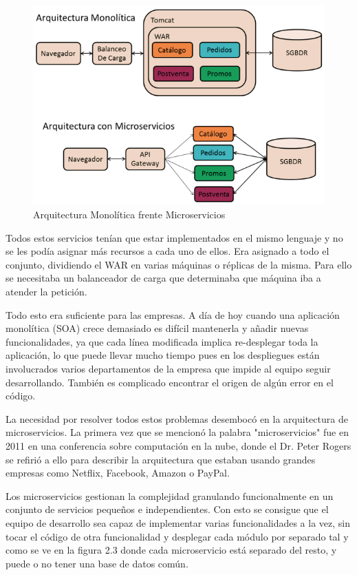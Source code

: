 \documentclass[12pt]{report} %
\begin{document}
\begin{figure}
	\centering
	\includegraphics[width=0.7\linewidth]{imagenes/soavsmicroservicios}
	\caption{Arquitectura Monolítica frente Microservicios}
	\label{fig:soavsmicroservicios}
\end{figure}

Todos estos servicios tenían que estar implementados en el mismo lenguaje y no se les podía asignar más recursos a cada uno de ellos. Era asignado a todo el conjunto, dividiendo el WAR en varias máquinas o réplicas de la misma. Para ello se necesitaba un balanceador de carga que determinaba que máquina iba a atender la petición.


Todo esto era suficiente para las empresas. A día de hoy cuando una aplicación monolítica (SOA) crece demasiado es difícil mantenerla y añadir nuevas funcionalidades, ya que cada línea modificada implica re-desplegar toda la aplicación, lo que puede llevar mucho tiempo pues en los despliegues están involucrados varios departamentos de la empresa que impide al equipo seguir desarrollando. También es complicado encontrar el origen de algún error en el código.

La necesidad por resolver todos estos problemas desembocó en la arquitectura de microservicios. La primera vez que se mencionó la palabra "microservicios" fue en 2011 en una conferencia sobre computación en la nube, donde el Dr. Peter Rogers\cite{breveHistoria} se refirió a ello para describir la arquitectura que estaban usando grandes empresas como Netflix, Facebook, Amazon o PayPal. 

Los microservicios gestionan la complejidad granulando funcionalmente en un conjunto de servicios pequeños e independientes. Con esto se consigue que el equipo de desarrollo sea capaz de implementar varias funcionalidades a la vez, sin tocar el código de otra  funcionalidad y desplegar cada módulo por separado tal y como se ve en la figura 2.3 donde cada microservicio está separado del resto, y puede o no tener una base de datos común.
\end{document}
